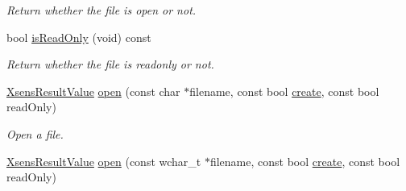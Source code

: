 \begin{DoxyCompactItemize}
\begin{DoxyCompactList}\small\item\em \-Return whether the file is open or not. \end{DoxyCompactList}\item 
\hypertarget{classxsens_1_1Cmt1f_a176ec162dda5146c4f91024eb4fd1778}{bool \hyperlink{classxsens_1_1Cmt1f_a176ec162dda5146c4f91024eb4fd1778}{is\-Read\-Only} (void) const }\label{classxsens_1_1Cmt1f_a176ec162dda5146c4f91024eb4fd1778}

\begin{DoxyCompactList}\small\item\em \-Return whether the file is readonly or not. \end{DoxyCompactList}\item 
\hypertarget{classxsens_1_1Cmt1f_ac3623b1bd3ab4aa7aaa1cdfe494494d7}{\hyperlink{group__enums_ga822a2260a20af524029eef9e9a51ff6f}{\-Xsens\-Result\-Value} \hyperlink{classxsens_1_1Cmt1f_ac3623b1bd3ab4aa7aaa1cdfe494494d7}{open} (const char $\ast$filename, const bool \hyperlink{classxsens_1_1Cmt1f_afe9e7fd93967527fcabfdc0e248f9acc}{create}, const bool read\-Only)}\label{classxsens_1_1Cmt1f_ac3623b1bd3ab4aa7aaa1cdfe494494d7}

\begin{DoxyCompactList}\small\item\em \-Open a file. \end{DoxyCompactList}\item 
\hypertarget{classxsens_1_1Cmt1f_a32a7d14f2a28e4624e00168c16c5e5c5}{\hyperlink{group__enums_ga822a2260a20af524029eef9e9a51ff6f}{\-Xsens\-Result\-Value} \hyperlink{classxsens_1_1Cmt1f_a32a7d14f2a28e4624e00168c16c5e5c5}{open} (const wchar\-\_\-t $\ast$filename, const bool \hyperlink{classxsens_1_1Cmt1f_afe9e7fd93967527fcabfdc0e248f9acc}{create}, const bool read\-Only)}\label{classxsens_1_1Cmt1f_a32a7d14f2a28e4624e00168c16c5e5c5}


\end{DoxyCompactItemize}
